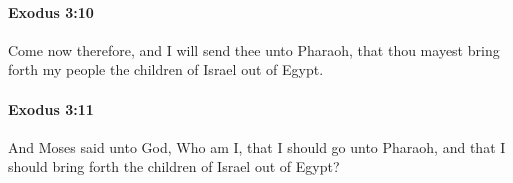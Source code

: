 		\paragraph{Exodus 3:10} %
			\label{EXODUS-3-10}

			Come now therefore, and I will send thee unto Pharaoh, that thou mayest bring forth my people the children of Israel out of Egypt.


		\paragraph{Exodus 3:11} %
			\label{EXODUS-3-11}

			And Moses said unto God, Who am I, that I should go unto Pharaoh, and that I should bring forth the children of Israel out of Egypt?


